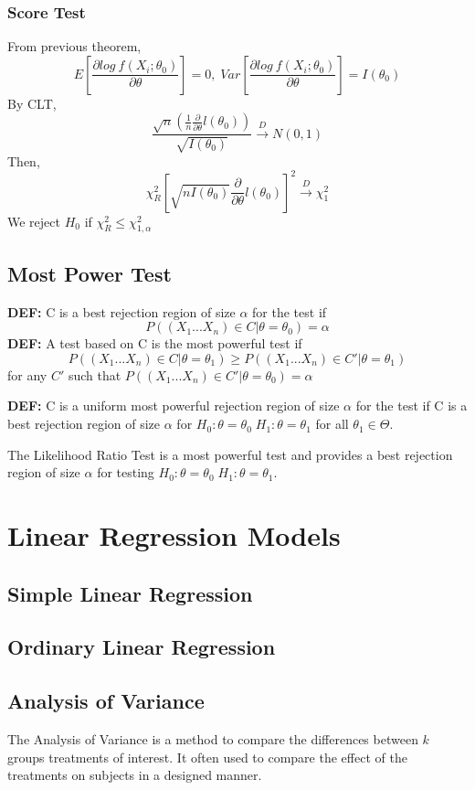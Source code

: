 \documentclass[9pt]{article}
\newcommand{\de}{\textbf{DEF: }}
\newenvironment{theorem}[2][Theorem]{\begin{trivlist}
\item[\hskip \labelsep {\bfseries #1}\hskip \labelsep {\bfseries #2}]}{\end{trivlist}}
\begin{document}
\subsubsection{Score Test}
From previous theorem,
$$
E\left[ \frac{\partial log\ f(X_i;\theta_0)}{\partial \theta} \right]=0, \; Var\left[ \frac{\partial log\ f(X_i;\theta_0)}{\partial \theta} \right] = I(\theta_0)
$$
By CLT,
$$
    \frac{\sqrt{n}(\frac{1}{n}\frac{\partial}{\partial \theta}l(\theta_0))}{\sqrt{I(\theta_0)}} \overset{D}{\to} N(0,1)
$$
Then,
$$
   \chi^2_R \left[\sqrt{nI(\theta_0)}\frac{\partial}{\partial \theta}l(\theta_0)\right]^2 \overset{D}{\to} \chi^2_1
$$
We reject $H_0$ if $\chi^2_R \le \chi^2_{1,\alpha}$

\subsection{Most Power Test}
\de C is a best rejection region of size $\alpha$ for the test if 
$$
    P((X_1...X_n)\in C|\theta=\theta_0) = \alpha
$$
\de A test based on C is the most powerful test if
$$
    P((X_1...X_n)\in C|\theta=\theta_1) \ge P((X_1...X_n)\in C'|\theta=\theta_1)
$$
for any $C'$ such that $P((X_1...X_n)\in C'|\theta=\theta_0) = \alpha$\newline

\de C is a uniform most powerful rejection region of size $\alpha$ for the test if C is a best rejection region of size $\alpha$ for $H_0: \theta = \theta_0 \; H_1:\theta=\theta_1$ for all $\theta_1 \in \Theta$. 
\begin{theorem} {Neyman-Pearson Theorem}
The Likelihood Ratio Test is a most powerful test and provides a best rejection region of size $\alpha$ for testing $H_0: \theta = \theta_0 \; H_1:\theta=\theta_1$.
\end{theorem}

\newpage
\section{Linear Regression Models}
\subsection{Simple Linear Regression}
\subsection{Ordinary Linear Regression}
\subsection{Analysis of Variance}
The Analysis of Variance is a method to compare the differences between $k$ groups treatments of interest. It often used to compare the effect of the treatments on subjects in a designed manner. 
\end{document}
